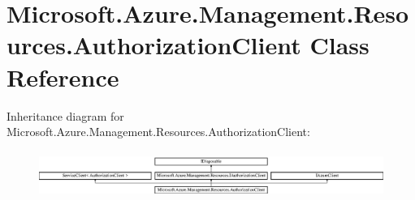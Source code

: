 \hypertarget{class_microsoft_1_1_azure_1_1_management_1_1_resources_1_1_authorization_client}{}\section{Microsoft.\+Azure.\+Management.\+Resources.\+Authorization\+Client Class Reference}
\label{class_microsoft_1_1_azure_1_1_management_1_1_resources_1_1_authorization_client}


 


Inheritance diagram for Microsoft.\+Azure.\+Management.\+Resources.\+Authorization\+Client\+:\begin{figure}[H]
\begin{center}
\leavevmode
\includegraphics[height=1.538462cm]{class_microsoft_1_1_azure_1_1_management_1_1_resources_1_1_authorization_client}
\end{center}
\end{figure}
